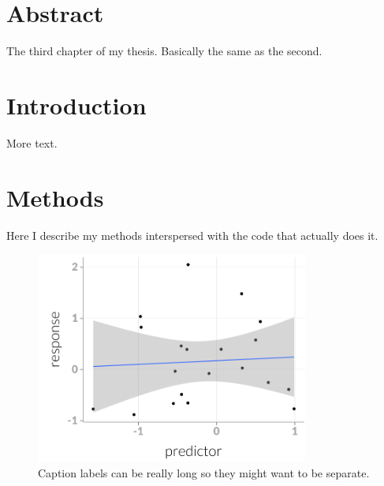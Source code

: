 
\clearpage









\section{Abstract}

The third chapter of my thesis.
Basically the same as the second.





\section{Introduction}


More text.


\section{Methods}

Here I describe my methods interspersed with the code that actually does it.











\begin{knitrout}\footnotesize
{}\color{fgcolor}\begin{figure}[t]

{\centering \includegraphics[width=0.8\textwidth]{figure/figPlots-1} 

}

\caption[A great figure.]{
Caption labels can be really long so they might want to be separate. 
}\label{f:figPlots}
\end{figure}


\end{knitrout}

